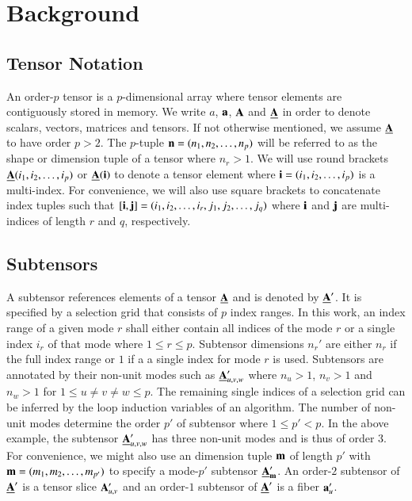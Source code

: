 \section{Background}
\label{sec:preliminaries}

\subsection{Tensor Notation}
\label{sec:preliminaries:notation}
An order-$p$ tensor is a $p$-dimensional array  where tensor elements are contiguously stored in memory\cite{lim:2017:hypermatrices, lee:2018:fundamental}.
We write $a$, $\mathbf{a}$, $\mathbf{A}$ and $\underline{\mathbf{A}}$ in order to denote scalars, vectors, matrices and tensors. 
If not otherwise mentioned, we assume $\underline{\mathbf{A}}$ to have order $p>2$.
The $p$-tuple $\mathbf{n} = (n_1,n_2,\dots,n_p)$ will be referred to as the shape or dimension tuple of a tensor where $n_r>1$.
We will use round brackets $\underline{\mathbf{A}}(i_1,i_2,\dots,i_p)$ or $\underline{\mathbf{A}}(\mathbf{i})$ to denote a tensor element where $\mathbf{i} = (i_1,i_2,\dots,i_p)$ is a multi-index.
For convenience, we will also use square brackets to concatenate index tuples such that 
$[\mathbf{i},\mathbf{j}] = (i_1,i_2,\dots,i_r,\allowbreak j_1,j_2,\dots,j_q)$ where $\mathbf{i}$ and $\mathbf{j}$ are multi-indices of length $r$ and $q$, respectively.

\subsection{Subtensors}
A subtensor references elements of a tensor $\underline{\mathbf{A}}$ and is denoted by $\underline{\mathbf{A}}'$.
It is specified by a selection grid that consists of $p$ index ranges.
In this work, an index range of a given mode $r$ shall either contain all indices of the mode $r$ or a single index $i_r$ of that mode where $1 \leq r \leq p$. 
Subtensor dimensions $n_r'$ are either $n_r$ if the full index range or $1$ if a a single index for mode $r$ is used.
Subtensors are annotated by their non-unit modes such as $\underline{\mathbf{A}}_{u,v,w}'$ where $n_u > 1$, $n_v > 1$ and $n_w >1$ for $1 \leq u \neq v \neq w \leq p$.
The remaining single indices of a selection grid can be inferred by the loop induction variables of an algorithm. 
The number of non-unit modes determine the order $p'$ of subtensor where $1 \leq p' < p$.
In the above example, the subtensor $\underline{\mathbf{A}}_{u,v,w}'$ has three non-unit modes and is thus of order $3$.
For convenience, we might also use an dimension tuple $\mathbf{m}$ of length $p'$ with $\mathbf{m} = (m_1,m_2,\dots,m_{p'})$ to specify a mode-$p'$ subtensor $\underline{\mathbf{A}}_{\mathbf{m}}'$.
An order-$2$ subtensor of $\underline{\mathbf{A}}'$ is a tensor slice $\mathbf{A}_{u,v}'$ and an order-$1$ subtensor of $\underline{\mathbf{A}}'$ is a fiber $\mathbf{a}_u'$.

